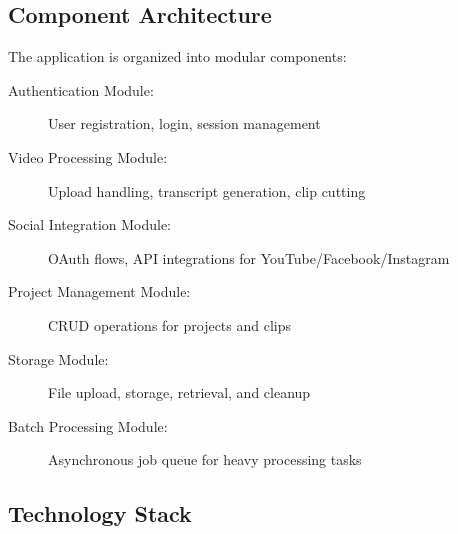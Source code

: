 \subsection{Component Architecture}

The application is organized into modular components:

\begin{description}
    \item[Authentication Module:] User registration, login, session management
    \item[Video Processing Module:] Upload handling, transcript generation, clip cutting
    \item[Social Integration Module:] OAuth flows, API integrations for YouTube/Facebook/Instagram
    \item[Project Management Module:] CRUD operations for projects and clips
    \item[Storage Module:] File upload, storage, retrieval, and cleanup
    \item[Batch Processing Module:] Asynchronous job queue for heavy processing tasks
\end{description}

\subsection{Technology Stack}

